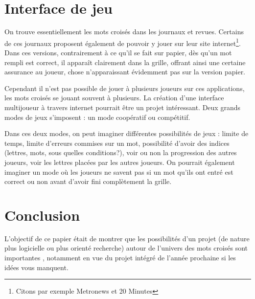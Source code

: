\documentclass{article}
\begin{document}
\section{Interface de jeu}

On trouve essentiellement les mots croisés dans les journaux et revues. Certains de ces journaux proposent également de pouvoir y jouer sur leur site internet\footnote{Citons par exemple Metronews et 20 Minutes}. Dans ces versions, contrairement à ce qu'il se fait sur papier, dès qu'un mot rempli est correct, il apparaît clairement dans la grille, offrant ainsi une certaine assurance au joueur, chose n'apparaissant évidemment pas sur la version papier.

Cependant il n'est pas possible de jouer à plusieurs joueurs sur ces applications, les mots croisés se jouant souvent à plusieurs. La création d'une interface multijoueur à travers internet pourrait être un projet intéressant. Deux grands modes de jeux s'imposent : un mode coopératif ou compétitif.

Dans ces deux modes, on peut imaginer différentes possibilités de jeux : limite de temps, limite d'erreurs commises sur un mot, possibilité d'avoir des indices (lettres, mots, sous quelles conditions?), voir ou non la progression des autres joueurs, voir les lettres placées par les autres joueurs. On pourrait également imaginer un mode où les joueurs ne savent pas si un mot qu'ils ont entré est correct ou non avant d'avoir fini complètement la grille.

\section{Conclusion}

L'objectif de ce papier était de montrer que les possibilités d'un projet (de nature plus logicielle ou plus orienté recherche) autour de l'univers des mots croisés sont importantes , notamment en vue du projet intégré de l'année prochaine si les idées vous manquent.



\end{document}

